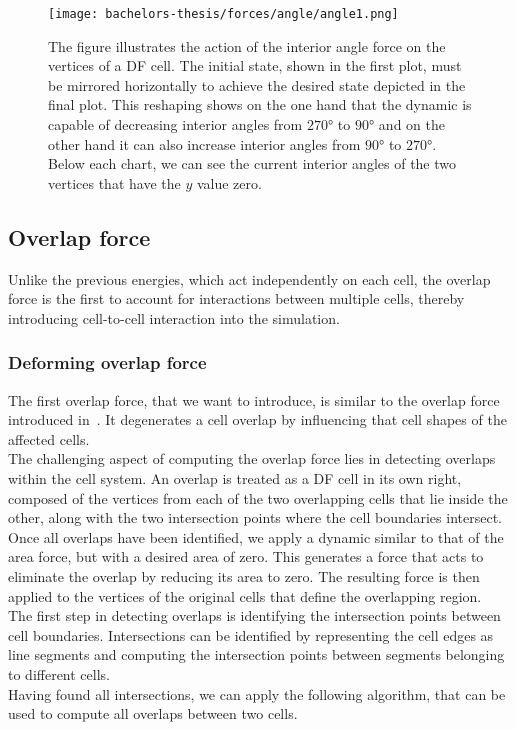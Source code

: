 \begin{figure}
	\begin{center}
		\texttt{[image: bachelors-thesis/forces/angle/angle1.png]}
		\caption{The figure illustrates the action of the interior angle force on the vertices of a DF cell.
		The initial state, shown in the first plot, must be mirrored horizontally to achieve the desired state depicted in the final plot.
		This reshaping shows on the one hand that the dynamic is capable of decreasing interior angles from $270$° to $90$° and on the other hand it can also increase interior angles from $90$° to $270$°. 
		Below each chart, we can see the current interior angles of the two vertices that have the $y$ value zero. 
		}
		\label{fig:angleForce}
	\end{center}
\end{figure}





 

\subsection{Overlap force}
Unlike the previous energies, which act independently on each cell, the overlap force is the first to account for interactions between multiple cells, thereby introducing cell-to-cell interaction into the simulation. \\

\subsubsection*{Deforming overlap force}
The first overlap force, that we want to introduce, is similar to the overlap force introduced in~\cite{Vogel2023}. 
It degenerates a cell overlap by influencing that cell shapes of the affected cells. \\
The challenging aspect of computing the overlap force lies in detecting overlaps within the cell system. 
An overlap is treated as a DF cell in its own right, composed of the vertices from each of the two overlapping cells that lie inside the other, along with the two intersection points where the cell boundaries intersect. \\ 
Once all overlaps have been identified, we apply a dynamic similar to that of the area force, but with a desired area of zero. 
This generates a force that acts to eliminate the overlap by reducing its area to zero. 
The resulting force is then applied to the vertices of the original cells that define the overlapping region. \\
The first step in detecting overlaps is identifying the intersection points between cell boundaries.
Intersections can be identified by representing the cell edges as line segments and computing the intersection points between segments belonging to different cells. \\
Having found all intersections, we can apply the following algorithm, that can be used to compute all overlaps between two cells. 

